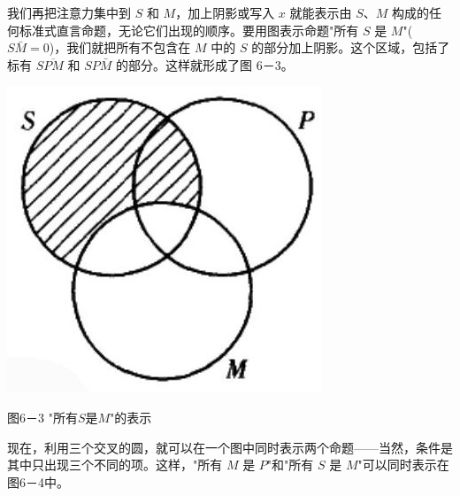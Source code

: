我们再把注意力集中到 $S$ 和 $M$，加上阴影或写入 $x$ 就能表示由 $S$、$M$ 构成的任何标准式直言命题，无论它们出现的顺序。要用图表示命题"所有 $S$ 是 $M$"($S\bar{M}=0$)，我们就把所有不包含在 $M$ 中的 $S$ 的部分加上阴影。这个区域，包括了标有 $S\overline{PM}$ 和 $SP\bar{M}$ 的部分。这样就形成了图 6－3。

\begin{center}
\includegraphics[width=\textwidth]{images/2025_05_15_6a28331d5e7c993ad07ag-275(1).jpg}

图6－3 "所有$S$是$M$"的表示
\end{center}

现在，利用三个交叉的圆，就可以在一个图中同时表示两个命题——当然，条件是其中只出现三个不同的项。这样，"所有 $M$ 是 $P$"和"所有 $S$ 是 $M$"可以同时表示在图6－4中。

